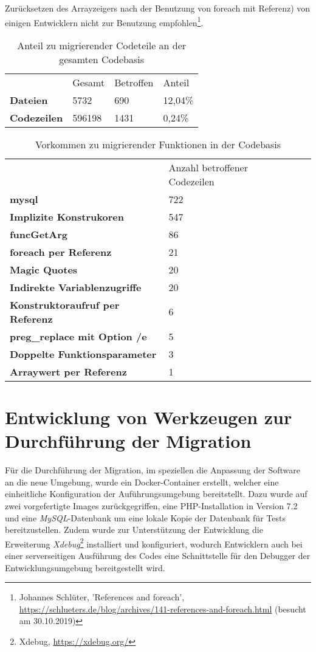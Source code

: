 Zurücksetzen des Arrayzeigers nach der Benutzung von foreach mit Referenz) von einigen Entwicklern nicht zur Benutzung empfohlen\footnote{Johannes Schlüter, 'References and foreach', \url{https://schlueters.de/blog/archives/141-references-and-foreach.html} (besucht am 30.10.2019)}.
\begin{table}
    \centering
    \caption{Anteil zu migrierender Codeteile an der gesamten Codebasis}
    \label{tab:migrationPercentage}
    \begin{tabular}{llll}
                        & Gesamt & Betroffen & Anteil   \\
    \textbf{Dateien}    & 5732   & 690       & 12,04\%  \\
    \textbf{Codezeilen} & 596198 & 1431      & 0,24\%  
    \end{tabular}
\end{table}

\begin{table}
    \centering
    \caption{Vorkommen zu migrierender Funktionen in der Codebasis}
    \label{tab:migrationFunctions}
    \begin{tabular}{llll}
                                            & Anzahl betroffener Codezeilen \\
    \textbf{mysql}                          & 722 \\
    \textbf{Implizite Konstrukoren}         & 547 \\
    \textbf{funcGetArg}                     & 86 \\
    \textbf{foreach per Referenz}           & 21 \\
    \textbf{Magic Quotes}                   & 20 \\
    \textbf{Indirekte Variablenzugriffe}    & 20 \\
    \textbf{Konstruktoraufruf per Referenz} & 6 \\
    \textbf{preg\_replace mit Option /e}    & 5 \\
    \textbf{Doppelte Funktionsparameter}    & 3 \\
    \textbf{Arraywert per Referenz}         & 1 \\
    \end{tabular}
\end{table}

\section{Entwicklung von Werkzeugen zur Durchführung der Migration}\label{migrationtools}
Für die Durchführung der Migration, im speziellen die Anpassung der Software an die neue Umgebung, wurde ein Docker-Container 
erstellt, welcher eine einheitliche Konfiguration der Auführungsumgebung bereitstellt. Dazu wurde auf zwei vorgefertigte 
Images zurückgegriffen, eine \ac{PHP}-Installation in Version 7.2 und eine \textit{MySQL}-Datenbank um eine lokale Kopie 
der Datenbank für Tests bereitzustellen. Zudem wurde zur Unterstützung der Entwicklung die Erweiterung \textit{Xdebug}\footnote{Xdebug, \url{https://xdebug.org/}} 
installiert und konfiguriert, wodurch Entwicklern auch bei einer serverseitigen Ausführung des Codes eine Schnittstelle 
für den Debugger der Entwicklungsumgebung bereitgestellt wird.

